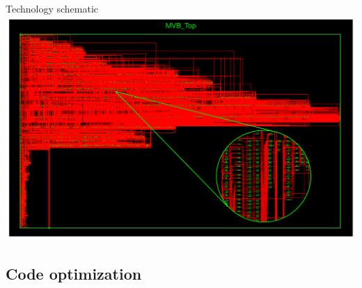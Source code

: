 \documentclass[12pt,beamer]{beamer}
\begin{document}
\begin{frame}{Technology schematic}
	\includegraphics[width=\textwidth]{pic/TechnologySchematic.pdf}
\end{frame}

\subsection{Code optimization}
\end{document}
